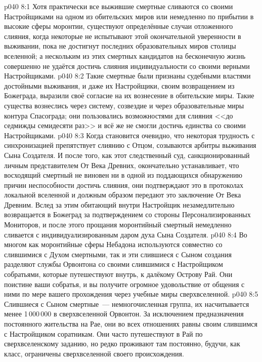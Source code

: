 \vs p040 8:1 Хотя практически все выжившие смертные сливаются со своими Настройщиками на одном из обительских миров или немедленно по прибытии в высокие сферы моронтии, существуют определённые случаи отложенного слияния, когда некоторые не испытывают этой окончательной уверенности в выживании, пока не достигнут последних образовательных миров столицы вселенной; а нескольким из этих смертных кандидатов на бесконечную жизнь совершенно не удаётся достичь слияния индивидуальности со своими верными Настройщиками.
\vs p040 8:2 Такие смертные были признаны судебными властями достойными выживания, и даже их Настройщики, своим возвращением из Божеграда, выразили своё согласие на их вознесение в обительские миры. Такие существа вознеслись через систему, созвездие и через образовательные миры контура Спасограда; они пользовались возможностями для слияния <<до седмижды семидесяти раз>> и всё же не смогли достичь единства со своими Настройщиками.
\vs p040 8:3 Когда становится очевидно, что некоторая трудность с синхронизацией препятствует слиянию с Отцом, созываются арбитры выживания Сына Создателя. И после того, как этот следственный суд, санкционированный личным представителем От Века Древних, окончательно устанавливает, что восходящий смертный не виновен ни в одной из поддающихся обнаружению причин неспособности достичь слияния, они подтверждают это в протоколах локальной вселенной и должным образом передают это заключение От Века Древним. Вслед за этим обитающий внутри Настройщик незамедлительно возвращается в Божеград за подтверждением со стороны Персонализированных Мониторов, и после этого прощания моронтийный смертный немедленно сливается с индивидуализированным даром духа Сына Создателя.
\vs p040 8:4 \pc Во многом как моронтийные сферы Небадона используются совместно со слившимися с Духом смертными, так и эти слившиеся с Сыном создания разделяют службы Орвонтона со своими слившимися с Настройщиком собратьями, которые путешествуют внутрь, к далёкому Острову Рай. Они поистине ваши собратья, и вы получите огромное удовольствие от общения с ними по мере вашего прохождения через учебные миры сверхвселенной.
\vs p040 8:5 Слившиеся с Сыном смертные~--- немногочисленная группа, их насчитывается менее 1\,000\,000 в сверхвселенной Орвонтон. За исключением предназначения постоянного жительства на Рае, они во всех отношениях равны своим слившимся с Настройщиком соратникам. Они часто путешествуют в Рай по сверхвселенскому заданию, но редко проживают там постоянно, будучи, как класс, ограничены сверхвселенной своего происхождения.
